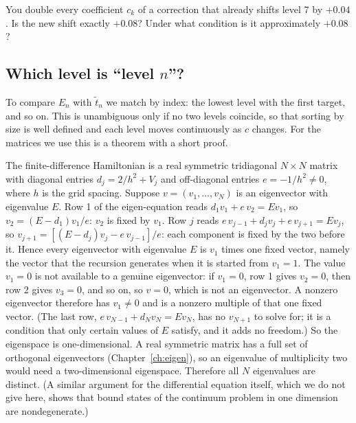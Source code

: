 \begin{checkpoint}
You double every coefficient $c_k$ of a correction that already shifts level 7 by $+0.04$. Is the new shift exactly $+0.08$? Under what condition is it approximately $+0.08$?
\end{checkpoint}

\subsection{Which level is ``level $n$''?}

To compare $E_n$ with $\tilde t_n$ we match by index: the lowest level with the first target, and so on. This is unambiguous only if no two levels coincide, so that sorting by size is well defined and each level moves continuously as $c$ changes. For the matrices we use this is a theorem with a short proof.

The finite-difference Hamiltonian is a real symmetric tridiagonal $N\times N$ matrix with diagonal entries $d_j=2/h^2+V_j$ and off-diagonal entries $e=-1/h^2\neq 0$, where $h$ is the grid spacing. Suppose $v=(v_1,\dots,v_N)$ is an eigenvector with eigenvalue $E$. Row 1 of the eigen-equation reads $d_1v_1+e\,v_2=Ev_1$, so $v_2=(E-d_1)v_1/e$: $v_2$ is fixed by $v_1$. Row $j$ reads $e\,v_{j-1}+d_jv_j+e\,v_{j+1}=Ev_j$, so $v_{j+1}=[(E-d_j)v_j-e\,v_{j-1}]/e$: each component is fixed by the two before it. Hence every eigenvector with eigenvalue $E$ is $v_1$ times one fixed vector, namely the vector that the recursion generates when it is started from $v_1=1$. The value $v_1=0$ is not available to a genuine eigenvector: if $v_1=0$, row 1 gives $v_2=0$, then row 2 gives $v_3=0$, and so on, so $v=0$, which is not an eigenvector. A nonzero eigenvector therefore has $v_1\neq0$ and is a nonzero multiple of that one fixed vector. (The last row, $e\,v_{N-1}+d_Nv_N=Ev_N$, has no $v_{N+1}$ to solve for; it is a condition that only certain values of $E$ satisfy, and it adds no freedom.) So the eigenspace is one-dimensional. A real symmetric matrix has a full set of orthogonal eigenvectors (Chapter~\ref{ch:eigen}), so an eigenvalue of multiplicity two would need a two-dimensional eigenspace. Therefore all $N$ eigenvalues are distinct. (A similar argument for the differential equation itself, which we do not give here, shows that bound states of the continuum problem in one dimension are nondegenerate.)


